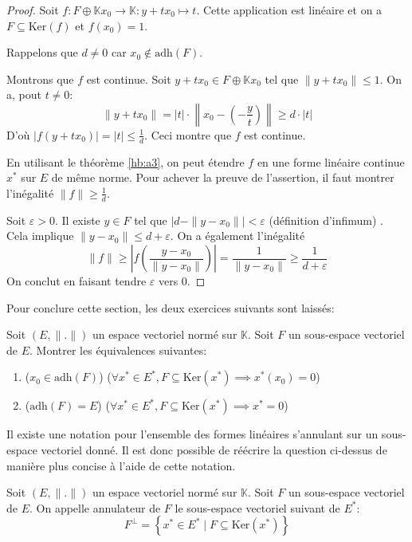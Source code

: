 \begin{proof}
  Soit $f: F\oplus \mathbb{K}x_0\to\mathbb{K}:y+tx_0\mapsto t$.
  Cette application est linéaire et on a $F\subseteq \mathrm{Ker}(f)$
  et $f(x_0)=1$.

  Rappelons que $d\neq 0$ car $x_0\notin \mathrm{adh}(F)$.

  Montrons que $f$ est continue.
  Soit $y + tx_0\in F\oplus \mathbb{K}x_0$ tel que
  $\|y + t x_0\|\leq 1$. On a, pout $t\neq 0$:
  $$\|y + tx_0\| = |t|\cdot \left\|x_0 - \left(-\frac{y}{t}\right)\right\|\geq d\cdot |t|$$
  D'où $|f(y + t x_0)| = |t|\leq \frac{1}{d}$. Ceci montre que $f$
  est continue.

  En utilisant le théorème \ref{hb:a3}, on peut étendre $f$
  en une forme linéaire continue $x^*$ sur $E$ de même norme.
  Pour achever la preuve de l'assertion, il faut montrer l'inégalité
  $\|f\|\geq \frac{1}{d}$.

  Soit $\varepsilon >0$. Il existe $y\in F$ tel que
  $|d-\|y-x_0\||<\varepsilon$ (définition d'infimum)
  . Cela implique $\| y - x_0\|\leq d + \varepsilon$.
  On a également l'inégalité
  $$\|f\|\geq \left|f\left(\frac{y - x_0}{\| y - x_0\|}\right)\right|
  =\frac{1}{\| y - x_0\|}
  \geq \frac{1}{d+\varepsilon}$$
  On conclut en faisant tendre $\varepsilon$ vers 0.
\end{proof}

Pour conclure cette section, les deux exercices suivants sont laissés:
\begin{exo}\label{hb:a:exo1}
  Soit $(E, \|.\|)$ un espace vectoriel normé sur $\mathbb{K}$.
  Soit $F$ un sous-espace vectoriel de $E$. Montrer les équivalences
  suivantes:
  \begin{enumerate}
  \item ($x_0\in\mathrm{adh}(F)$) \ssi{} ($\forall x^*\in E^*,
    F\subseteq \mathrm{Ker}(x^*)\implies x^*(x_0) = 0$)
  \item ($\mathrm{adh}(F) = E$)  \ssi{}  ($\forall x^*\in E^*,
    F\subseteq \mathrm{Ker}(x^*)\implies x^* = 0$)
  \end{enumerate}
\end{exo}

Il existe une notation pour l'ensemble des formes linéaires
s'annulant sur un sous-espace vectoriel donné. Il est donc
possible de réécrire la question ci-dessus de manière plus
concise à l'aide de cette notation.

\begin{df}
  Soit $(E, \|.\|)$ un espace vectoriel normé sur $\mathbb{K}$.
  Soit $F$ un sous-espace vectoriel de $E$. On appelle
  annulateur de $F$ le sous-espace vectoriel suivant
  de $E^*$:
  $$F^\perp = \left\{x^*\in E^*\mid F\subseteq \mathrm{Ker}(x^*)\right\}$$
\end{df}

